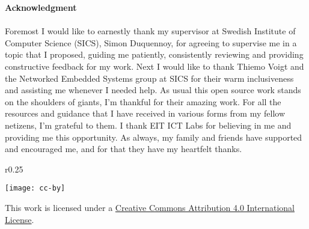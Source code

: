 
\clearpage

%

\newpage\null\thispagestyle{empty}\newpage

\thispagestyle{plain}
{}
\huge{\textbf{Acknowledgment}} \\
\normalsize \\


Foremost I would like to earnestly thank my supervisor at Swedish Institute of Computer Science (SICS), Simon Duquennoy, for agreeing to supervise me in a topic that I proposed, guiding me patiently, consistently reviewing and providing constructive feedback for my work. Next I would like to thank Thiemo Voigt and the Networked Embedded Systems group at SICS for their warm inclusiveness and assisting me whenever I needed help. As usual this open source work stands on the shoulders of giants, I'm thankful for their amazing work. For all the resources and guidance that I have received in various forms from my fellow netizens, I'm grateful to them. I thank EIT ICT Labs for believing in me and providing me this opportunity. As always, my family and friends have supported and encouraged me, and for that they have my heartfelt thanks.
\clearpage

\newpage\null\thispagestyle{empty}\newpage

\tableofcontents
\null
\vfill
\begin{wrapfigure}{r}{0.25\textwidth}
\vspace{-30pt}
  \begin{center}
	\texttt{[image: cc-by]}
  \end{center}
\end{wrapfigure}
\noindent
{\large This work is licensed under a \href{http://creativecommons.org/licenses/by/4.0/}{Creative Commons Attribution 4.0 International License}.}


